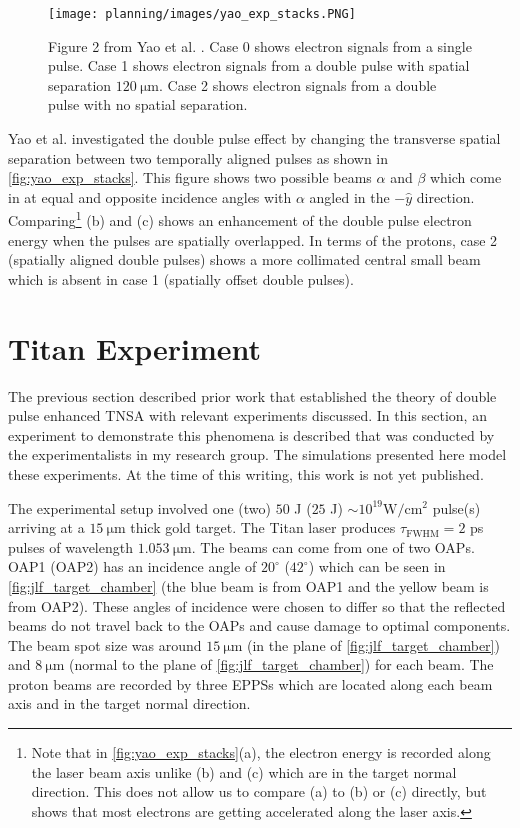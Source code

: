 \begin{figure}
	\centering 
	\texttt{[image: planning/images/yao\_exp\_stacks.PNG]}
	\caption{Figure 2 from Yao et al. \cite{Yao_2024_MaRaE}. Case 0 shows electron signals from a single pulse. Case 1 shows electron signals from a double pulse with spatial separation $\SI{120}{\micro \meter}$. Case 2 shows electron signals from a double pulse with no spatial separation.}
	\label{fig:yao_exp_stacks}
\end{figure}

Yao et al. \cite{Yao_2024_MaRaE} investigated the double pulse effect by changing the transverse spatial separation between two temporally aligned pulses as shown in \autoref{fig:yao_exp_stacks}. This figure shows two possible beams $\alpha$ and $\beta$ which come in at equal and opposite incidence angles with $\alpha$ angled in the $-\hat{y}$ direction. Comparing\footnote{Note that in \autoref{fig:yao_exp_stacks}(a), the electron energy is recorded along the laser beam axis unlike (b) and (c) which are in the target normal direction. This does not allow us to compare (a) to (b) or (c) directly, but shows that most electrons are getting accelerated along the laser axis.} (b) and (c) shows an enhancement of the double pulse electron energy when the pulses are spatially overlapped. In terms of the protons, case 2 (spatially aligned double pulses) shows a more collimated central small beam which is absent in case 1 (spatially offset double pulses).

\section{Titan Experiment} \label{sec:titan_experiment}

The previous section described prior work that established the theory of double pulse enhanced \gls{TNSA} with relevant experiments discussed. In this section, an experiment to demonstrate this phenomena is described that was conducted by the experimentalists in my research group. The simulations presented here model these experiments. At the time of this writing, this work is not yet published.

The experimental setup involved one (two) $50$ J ($25$ J) $\sim 10^{19} \unit{\watt \per \centi \meter \squared}$ pulse(s) arriving at a $\SI{15}{\micro \meter}$ thick gold target. The Titan laser produces $\tau_\text{FWHM} = 2$ ps pulses of wavelength $\SI{1.053}{\micro \meter}$. The beams can come from one of two \gls{OAP}s. \gls{OAP}1 (\gls{OAP}2) has an incidence angle of $20^\circ$ ($42^\circ$) which can be seen in \autoref{fig:jlf_target_chamber} (the blue beam is from \gls{OAP}1 and the yellow beam is from \gls{OAP}2). These angles of incidence were chosen to differ so that the reflected beams do not travel back to the \gls{OAP}s and cause damage to optimal components. The beam spot size was around $\SI{15}{\micro \meter}$ (in the plane of \autoref{fig:jlf_target_chamber}) and $\SI{8}{\micro \meter}$ (normal to the plane of \autoref{fig:jlf_target_chamber}) for each beam. The proton beams are recorded by three \gls{EPPS}s which are located along each beam axis and in the target normal direction.

